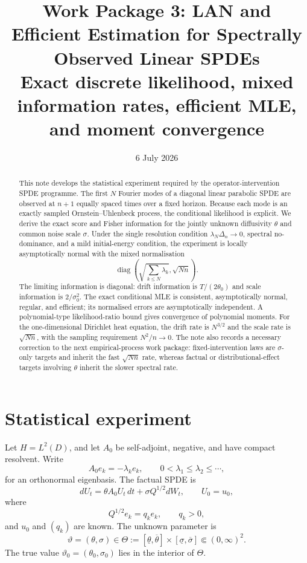 \documentclass[11pt]{article}
\title{Work Package 3: LAN and Efficient Estimation for Spectrally Observed Linear SPDEs\\
\large Exact discrete likelihood, mixed information rates, efficient MLE, and moment convergence}
\author{}
\date{6 July 2026}
\theoremstyle{remark}
\newcommand{\diag}{\operatorname{diag}}
\newcommand{\1}{\mathbf 1}
\newcommand{\vart}{\vartheta}
\newcommand{\vzero}{\vartheta_0}
\begin{document}
\maketitle

\begin{abstract}
This note develops the statistical experiment required by the operator-intervention SPDE programme.  The first $N$ Fourier modes of a diagonal linear parabolic SPDE are observed at $n+1$ equally spaced times over a fixed horizon.  Because each mode is an exactly sampled Ornstein--Uhlenbeck process, the conditional likelihood is explicit.  We derive the exact score and Fisher information for the jointly unknown diffusivity $\theta$ and common noise scale $\sigma$.  Under the single resolution condition $\lambda_N\Delta_n\to0$, spectral no-dominance, and a mild initial-energy condition, the experiment is locally asymptotically normal with the mixed normalisation
\[
 \diag\!\left(\sqrt{\sum_{k\le N}\lambda_k},\sqrt{Nn}\right).
\]
The limiting information is diagonal: drift information is $T/(2\theta_0)$ and scale information is $2/\sigma_0^2$.  The exact conditional MLE is consistent, asymptotically normal, regular, and efficient; its normalised errors are asymptotically independent.  A polynomial-type likelihood-ratio bound gives convergence of polynomial moments.  For the one-dimensional Dirichlet heat equation, the drift rate is $N^{3/2}$ and the scale rate is $\sqrt{Nn}$, with the sampling requirement $N^2/n\to0$.  The note also records a necessary correction to the next empirical-process work package: fixed-intervention laws are $\sigma$-only targets and inherit the fast $\sqrt{Nn}$ rate, whereas factual or distributional-effect targets involving $\theta$ inherit the slower spectral rate.
\end{abstract}

\section{Statistical experiment}

Let $H=L^2(D)$, and let $A_0$ be self-adjoint, negative, and have compact resolvent.  Write
\[
 A_0e_k=-\lambda_ke_k,
 \qquad 0<\lambda_1\le\lambda_2\le\cdots,
\]
for an orthonormal eigenbasis.  The factual SPDE is
\begin{equation}\label{eq:spde}
 dU_t=\theta A_0U_t\,dt+\sigma Q^{1/2}dW_t,
 \qquad U_0=u_0,
\end{equation}
where
\[
 Q^{1/2}e_k=q_ke_k,
 \qquad q_k>0,
\]
and $u_0$ and $(q_k)$ are known.  The unknown parameter is
\[
 \vart=(\theta,\sigma)\in\Theta
 :=[\underline\theta,\overline\theta]
 \times[\underline\sigma,\overline\sigma]
 \Subset(0,\infty)^2.
\]
The true value $\vzero=(\theta_0,\sigma_0)$ lies in the interior of $\Theta$.
\end{document}
